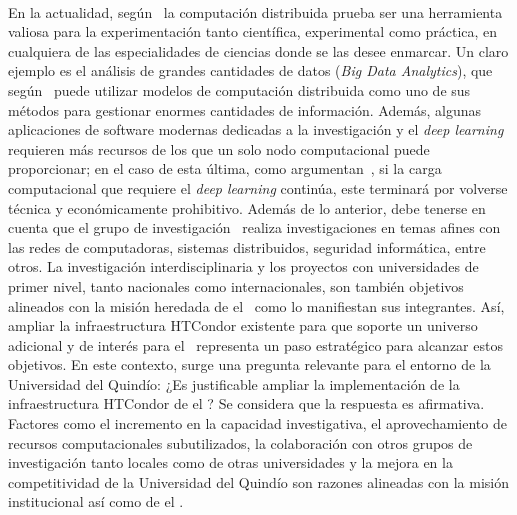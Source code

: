 \label{cap:justificacion}
\mbox{}\\

\noindent
En la actualidad, según~\cite{Bianchi2013} la computación distribuida prueba ser una herramienta valiosa para la experimentación tanto científica, experimental como práctica, en cualquiera de las especialidades de ciencias donde se las desee enmarcar. Un claro ejemplo es el análisis de grandes cantidades de datos (\textit{Big Data Analytics}), que según~\cite{Tsai2015} puede utilizar modelos de computación distribuida como uno de sus métodos para gestionar enormes cantidades de información. Además, algunas aplicaciones de software modernas dedicadas a la investigación y el \textit{deep learning} requieren más recursos de los que un solo nodo computacional puede proporcionar; en el caso de esta última, como argumentan~\cite{Thomson2023}, si la carga computacional que requiere el \textit{deep learning} continúa, este terminará por volverse técnica y económicamente prohibitivo.
Además de lo anterior, debe tenerse en cuenta que el grupo de investigación \GRID~realiza investigaciones en temas afines con las redes de computadoras, sistemas distribuidos, seguridad informática, entre otros. La investigación interdisciplinaria y los proyectos con universidades de primer nivel, tanto nacionales como internacionales, son también objetivos alineados con la misión heredada de el \GRID~como lo manifiestan sus integrantes. Así, ampliar la infraestructura HTCondor existente para que soporte un universo adicional y de interés para el \GRID~representa un paso estratégico para alcanzar estos objetivos.
En este contexto, surge una pregunta relevante para el entorno de la Universidad del Quindío: ¿Es justificable ampliar la implementación de la infraestructura HTCondor de el \GRID? Se considera que la respuesta es afirmativa. Factores como el incremento en la capacidad investigativa, el aprovechamiento de recursos computacionales subutilizados, la colaboración con otros grupos de investigación tanto locales como de otras universidades y la mejora en la competitividad de la Universidad del Quindío son razones alineadas con la misión institucional así como de el \GRID.
